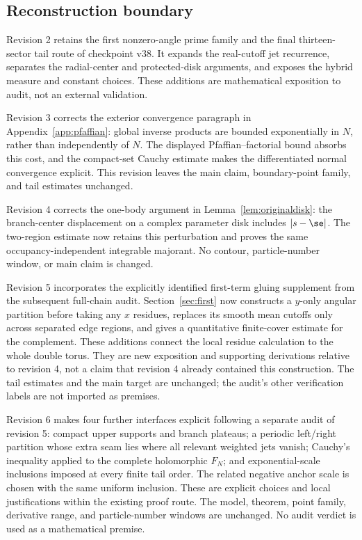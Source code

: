 \subsection{Reconstruction boundary}
Revision 2 retains the first nonzero-angle prime family and
the final thirteen-sector tail route of checkpoint v38.
It expands the real-cutoff jet recurrence, separates the
radial-center and protected-disk arguments, and exposes the
hybrid measure and constant choices. These additions are
mathematical exposition to audit, not an external validation.

Revision 3 corrects the exterior convergence paragraph in
Appendix~\ref{app:pfaffian}: global inverse products are bounded
exponentially in \(N\), rather than independently of \(N\).
The displayed Pfaffian--factorial bound absorbs this cost, and
the compact-set Cauchy estimate makes the differentiated
normal convergence explicit. This revision leaves the main
claim, boundary-point family, and tail estimates unchanged.

Revision 4 corrects the one-body argument in
Lemma~\ref{lem:originaldisk}: the branch-center displacement
on a complex parameter disk includes \(|s-\se|\).
The two-region estimate now retains this perturbation and
proves the same occupancy-independent integrable majorant.
No contour, particle-number window, or main claim is changed.

Revision 5 incorporates the explicitly identified first-term gluing
supplement from the subsequent full-chain audit. Section~\ref{sec:first}
now constructs a \(y\)-only angular partition before taking any
\(x\) residues, replaces its smooth mean cutoffs only across separated
edge regions, and gives a quantitative finite-cover estimate for the
complement. These additions connect the local residue calculation to
the whole double torus. They are new exposition and supporting
derivations relative to revision 4, not a claim that revision 4 already
contained this construction. The tail estimates and the main target
are unchanged; the audit's other verification labels are not imported
as premises.

Revision 6 makes four further interfaces explicit following a
separate audit of revision 5: compact upper supports and branch
plateaus; a periodic left/right partition whose extra seam lies
where all relevant weighted jets vanish; Cauchy's inequality
applied to the complete holomorphic \(F_N\); and exponential-scale
inclusions imposed at every finite tail order. The related negative
anchor scale is chosen with the same uniform inclusion. These are
explicit choices and local justifications within the existing proof
route. The model, theorem, point family, derivative range, and
particle-number windows are unchanged. No audit verdict is used
as a mathematical premise.

